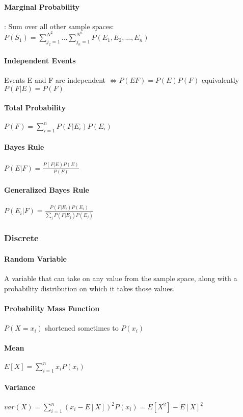 \paragraph{Marginal Probability}: Sum over all other sample spaces:
$P(S_1) = \sum_{j_2=1}^{N^2}...\sum_{j_n=1}^{N^n} P(E_1 , E_2  , ... , E_n ) $

\paragraph{Independent Events} Events E and F are independent 
$\iff P(EF) = P(E)P(F)$ equivalently $P(F|E) = P(F)$

\paragraph{Total Probability} $P(F) = \sum_{i=1}^n P(F | E_i )P(E_i)$

\paragraph{Bayes Rule} $P(E|F)=\frac{P(F|E)P(E)}{P(F)}$
\paragraph{Generalized Bayes Rule}
$P(E_i|F)=\frac{P(F|E_i)P(E_i)}{\sum_{j} P(F|E_j)P(E_j)}$


\subsubsection{Discrete}
\paragraph{Random Variable} A variable that can take on any value from the
sample space, along with a probability distribution on which it takes those
values.
\paragraph{Probability Mass Function} $P(X=x_i)$ shortened sometimes to $P(x_i)$
\paragraph{Mean} $E[X] = \sum_{i=1}^n x_i P(x_i)$
\paragraph{Variance} $var(X) = \sum_{i=1}^n (x_i - E[X])^2P(x_i) = E[X^2] - E[X]^2$
